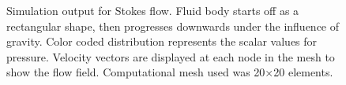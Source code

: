 \begin{figure}[ht]
\caption{Simulation output for Stokes flow. Fluid body starts off as a rectangular shape, then progresses downwards under the influence of gravity. Color coded distribution represents the scalar values for pressure. Velocity vectors are displayed at each node in the mesh to show the flow field. Computational mesh used was 20$\times$20 elements.}
\label{FLUID OUTPUT1}
\end{figure}
%
